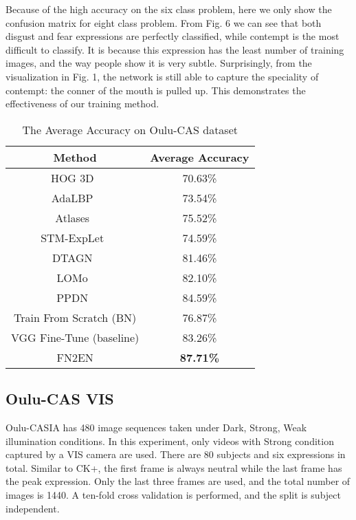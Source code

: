 \documentclass[a4paper, 10pt, conference]{ieeeconf}      %
\begin{document}
Because of the high accuracy on the six class problem, here we only show the confusion matrix for eight class problem. From Fig. 6 we can see that both disgust and fear expressions are perfectly classified, while contempt is the most difficult to classify. It is because this expression has the least number of training images, and the way people show it is very subtle. 
Surprisingly, from the visualization in Fig. 1, the network is still able to capture the speciality of contempt: the conner of the mouth is pulled up. This demonstrates the effectiveness of our training method.





\begin{table}
\caption{The Average Accuracy on Oulu-CAS dataset}
\label{table_example}
\begin{center}
\begin{tabular}{|c||c|}
\hline
Method & Average Accuracy\\
\hline
HOG 3D~\cite{klaser2008spatio} & 70.63\%\\
AdaLBP~\cite{zhao2011facial} & 73.54\%\\
Atlases~\cite{guo2012dynamic} & 75.52\%\\
STM-ExpLet~\cite{liu2014learning} & 74.59\%\\
DTAGN~\cite{jung2015deep}  & 81.46\%\\
LOMo~\cite{sikka2016lomo} & 82.10\%\\
PPDN~\cite{zhao2016peak}& 84.59\%\\
Train From Scratch (BN) & 76.87\%\\
VGG Fine-Tune (baseline) & 83.26\%\\
\hline
FN2EN & \textbf{87.71\%}\\
\hline
\end{tabular}
\end{center}
\vspace{-2mm}
\end{table}

\subsection{Oulu-CAS VIS}
Oulu-CASIA has 480 image sequences taken under Dark, Strong, Weak illumination conditions. In this experiment, only videos with Strong condition captured by a VIS camera are used. There are 80 subjects and six expressions in total. Similar to CK+, the first frame is always neutral while the last frame has the peak expression. Only the last three frames are used, and the total number of images is 1440. A ten-fold cross validation is performed, and the split is subject independent.
\end{document}

